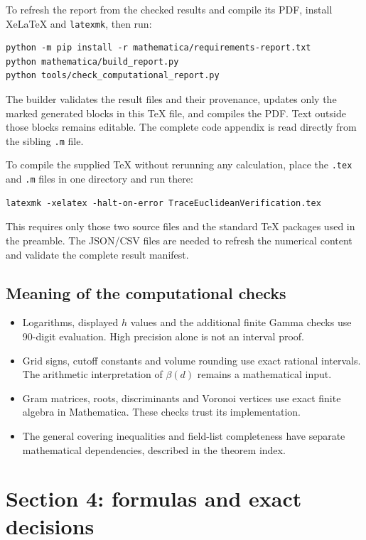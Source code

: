 \documentclass[12pt]{amsart}
\theoremstyle{remark}
\theoremstyle{definition}
\numberwithin{equation}{section}
\begin{document}
To refresh the report from the checked results and compile its PDF, install
XeLaTeX and \texttt{latexmk}, then run:
\begin{lstlisting}[style=commands]
python -m pip install -r mathematica/requirements-report.txt
python mathematica/build_report.py
python tools/check_computational_report.py
\end{lstlisting}
The builder validates the result files and their provenance, updates only the
marked generated blocks in this TeX file, and compiles the PDF. Text outside
those blocks remains editable. The complete code appendix is read directly
from the sibling \texttt{.m} file.

To compile the supplied TeX without rerunning any calculation, place the
\texttt{.tex} and \texttt{.m} files in one directory and run there:
\begin{lstlisting}[style=commands]
latexmk -xelatex -halt-on-error TraceEuclideanVerification.tex
\end{lstlisting}
This requires only those two source files and the standard TeX packages used
in the preamble. The JSON/CSV files are needed to refresh the numerical
content and validate the complete result manifest.

\subsection*{Meaning of the computational checks}
\begin{itemize}
\item Logarithms, displayed $h$ values and the additional finite Gamma checks
  use 90-digit evaluation. High precision alone is not an interval proof.
\item Grid signs, cutoff constants and volume rounding use exact rational
  intervals. The arithmetic interpretation of $\beta(d)$ remains a
  mathematical input.
\item Gram matrices, roots, discriminants and Voronoi vertices use exact
  finite algebra in Mathematica. These checks trust its implementation.
\item The general covering inequalities and field-list completeness have
  separate mathematical dependencies, described in the theorem index.
\end{itemize}

\clearpage
\section{Section 4: formulas and exact decisions}\label{sec:formulas}
\end{document}
